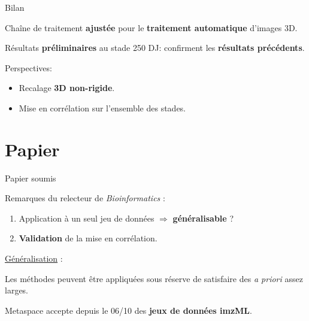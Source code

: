 \documentclass[10pt]{beamer}
\begin{document}
\begin{frame}{Bilan}

  Chaîne de traitement \textbf{ajustée} pour le \textbf{traitement automatique} d'images 3D.

  Résultats \textbf{préliminaires} au stade 250 DJ: confirment les \textbf{résultats précédents}.

  \vspace{0.4cm}

  Perspectives:
  \begin{itemize}
  \item Recalage \textbf{3D non-rigide}.
  \item Mise en corrélation sur l'ensemble des stades.
  \end{itemize}


\end{frame}




\section{Papier}

\begin{frame}{Papier soumis}
  
  Remarques du relecteur de \textit{Bioinformatics} :
  \begin{enumerate}
  \item Application à un seul jeu de données $\Rightarrow$ \textbf{généralisable} ?
  \item \textbf{Validation} de la mise en corrélation.
  \end{enumerate}

  \underline{Généralisation} :

   Les méthodes peuvent être appliquées sous réserve de satisfaire des \textit{a priori} assez larges.

  \vspace{0.3cm}

  Metaspace accepte depuis le 06/10 des \textbf{jeux de données imzML}.


\end{frame}
\end{document}
